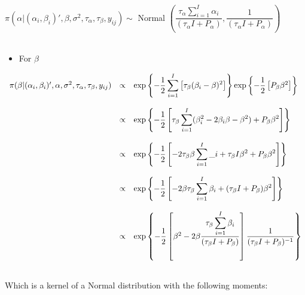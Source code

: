 \documentclass{article}
\begin{document}
$\pi(\alpha |(\alpha_i, \beta_i)', \beta, \sigma^2, \tau_\alpha, \tau_\beta ,y_{ij}) \sim $ Normal $\left( \dfrac{\tau_{\alpha}\displaystyle\sum_{i=1}^{I}\alpha_{i}}{(\tau_{\alpha}I + P_{\alpha})}, \dfrac{1}{(\tau_{\alpha}I + P_{\alpha})} \right)$ \\ \\

\begin{itemize}
\item For $\beta$
\end{itemize}
\begin{equation*}
\begin{array}{lcl ll }

\pi(\beta|(\alpha_i, \beta_i)', \alpha, \sigma^2, \tau_\alpha, \tau_\beta ,y_{ij}) & \propto & \mbox{exp}\left\{ - \dfrac{1}{2} 
\displaystyle\sum_{i=1}^{I} \left[ \tau_{\beta}(\beta_{i} - \beta)^2 \right]\right\}  \mbox{exp}\left\{ - \dfrac{1}{2} \left[ P_{\beta}\beta^2\right] \right\} \\ \\

& \propto & \mbox{exp}\left\{ - \dfrac{1}{2} \left[ 
\tau_{\beta}\displaystyle\sum_{i=1}^{I} (\beta_{i}^2 -2\beta_{i}\beta - \beta^2) + P_{\beta}\beta^2\right] \right\} \\ \\


& \propto & \mbox{exp}\left\{ - \dfrac{1}{2} \left[ -2
\tau_{\beta}\beta\displaystyle\sum_{i=1}^{I}\_{i} + \tau_{\beta}I\beta^2 + P_{\beta}\beta^2\right] \right\} \\ \\

& \propto & \mbox{exp}\left\{ - \dfrac{1}{2} \left[ -2
\beta\tau_{\beta}\displaystyle\sum_{i=1}^{I}\beta_{i} + (\tau_{\beta}I + P_{\beta})\beta^2\right] \right\} \\ \\

& \propto & \mbox{exp}\left\{ - \dfrac{1}{2} \left[ \beta^2 -2
\beta\dfrac{\tau_{\beta}\displaystyle\sum_{i=1}^{I}\beta_{i}}{(\tau_{\beta}I + P_{\beta})} \right] \dfrac{1}{(\tau_{\beta}I + P_{\beta})^{-1}} \right\} \\ \\

 \end{array}
\end{equation*}

Which is a kernel of a Normal distribution with the following moments:\\
\end{document}
